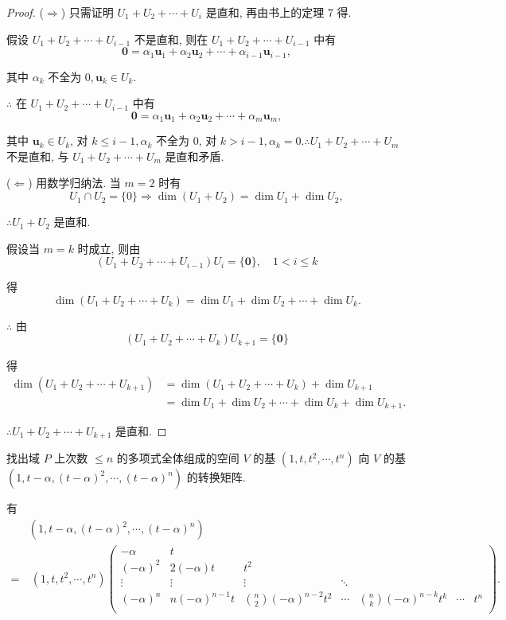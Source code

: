 \documentclass[color=black,device=normal,lang=cn,mode=geye]{elegantnote}
\begin{document}
\begin{proof}
    ($\Rightarrow$) 只需证明 $U_1+U_2+\cdots+U_i$ 是直和, 再由书上的定理 7 得.

    假设 $U_1+U_2+\cdots+U_{i-1}$ 不是直和, 则在 $U_1+U_2+\cdots+U_{i-1}$ 中有
    \[\boldsymbol{0}=\alpha_1\boldsymbol{u}_1+\alpha_2\boldsymbol{u}_2+\cdots+\alpha_{i-1}\boldsymbol{u}_{i-1},\]

    其中 $\alpha_k$ 不全为 $0,\boldsymbol{u}_k\in U_k$.

    $\therefore$ 在 $U_1+U_2+\cdots+U_{i-1}$ 中有
    \[\boldsymbol{0}=\alpha_1\boldsymbol{u}_1+\alpha_2\boldsymbol{u}_2+\cdots+\alpha_m\boldsymbol{u}_m,\]

    其中 $\boldsymbol{u}_k\in U_k$, 对 $k\leq i-1,\alpha_k$ 不全为 $0$, 对 $k>i-1,\alpha_k=0.\therefore U_1+U_2+\cdots+U_m$ 不是直和, 与 $U_1+U_2+\cdots+U_m$ 是直和矛盾.

    ($\Leftarrow$) 用数学归纳法. 当 $m=2$ 时有
    \[U_1\cap U_2=\{0\}\Rightarrow\dim(U_1+U_2)=\dim U_1+\dim U_2,\]

    $\therefore U_1+U_2$ 是直和.

    假设当 $m=k$ 时成立, 则由
    \[(U_1+U_2+\cdots+U_{i-1})U_i=\{\boldsymbol{0}\},\quad 1<i\leq k\]

    得
    \[\dim(U_1+U_2+\cdots+U_k)=\dim U_1+\dim U_2+\cdots+\dim U_k.\]

    $\therefore$ 由
    \[(U_1+U_2+\cdots+U_k)U_{k+1}=\{\boldsymbol{0}\}\]

    得
    \begin{align*}
        \dim(U_1+U_2+\cdots+U_{k+1}) & =\dim(U_1+U_2+\cdots+U_k)+\dim U_{k+1} \\
        & =\dim U_1+\dim U_2+\cdots+\dim U_k+\dim U_{k+1}.
    \end{align*}

    $\therefore U_1+U_2+\cdots+U_{k+1}$ 是直和.
\end{proof}
\begin{exercise}%
    找出域 $P$ 上次数 $\leq n$ 的多项式全体组成的空间 $V$ 的基 $(1,t,t^2,\cdots,t^n)$ 向 $V$ 的基 $(1,t-\alpha,(t-\alpha)^2,\cdots,(t-\alpha)^n)$ 的转换矩阵.
\end{exercise}
\begin{solution}
    有
    \begin{align*}
          & (1,t-\alpha,(t-\alpha)^2,\cdots,(t-\alpha)^n) \\
        = & \ (1,t,t^2,\cdots,t^n)\begin{pmatrix}
        -\alpha     & t \\
        (-\alpha)^2 & 2(-\alpha)t       & t^2 \\
        \vdots      & \vdots            & \vdots & \ddots \\
        (-\alpha)^n & n(-\alpha)^{n-1}t & \binom{n}{2}(-\alpha)^{n-2}t^2 & \cdots & \binom{n}{k}(-\alpha)^{n-k}t^k & \cdots & t^n \\
    \end{pmatrix}.
    \end{align*}
\end{solution}
\end{document}
